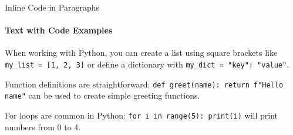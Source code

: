 \documentclass[10pt,aspectratio=169]{beamer}
\begin{document}
\begin{frame}{Inline Code in Paragraphs}
    \framesubtitle{Text with Code Examples}
    
    When working with Python, you can create a list using square brackets like 
    \texttt{my_list = [1, 2, 3]} or define a dictionary with 
    \texttt{my_dict = {"key": "value"}}.
    
    \medskip
    
    Function definitions are straightforward: \texttt{def greet(name): return f"Hello {name}"}
    can be used to create simple greeting functions.
    
    \medskip
    
    For loops are common in Python: \texttt{for i in range(5): print(i)} will print
    numbers from 0 to 4.
\end{frame}

\backmatter %
\end{document}
